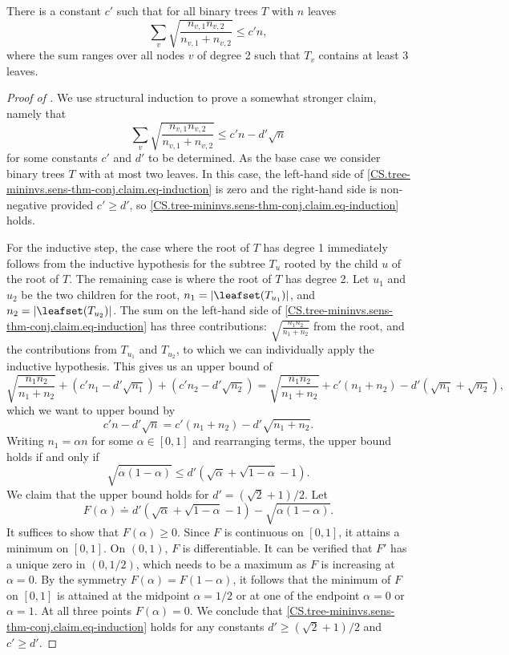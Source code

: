 \documentclass{toc}
\begin{document}
\begin{claim}
    \label{claim:sensitivity:sum}
    There is a constant $c'$ such that for all binary trees $T$ with $n$ leaves 
    \begin{equation}
      \sum_v \sqrt{\frac{n_{v,1}n_{v,2}}{n_{v,1}+n_{v,2}}} \le c'n,
    \end{equation}
    where the sum ranges over all nodes $v$ of degree 2 such that $T_v$ contains at least 3 leaves.
  \end{claim}
\begin{proof}[Proof of ]
We use structural induction to prove a somewhat stronger claim, namely that
\begin{equation}\label{CS.tree-mininvs.sens-thm-conj.claim.eq-induction}
  \sum_v \sqrt{\frac{n_{v,1}n_{v,2}}{n_{v,1}+n_{v,2}}} \le c' n - d' \sqrt{n}
\end{equation}
for some constants $c'$ and $d'$ to be determined.
As the base case we consider binary trees $T$ with at most two leaves. In this case, the left-hand side of \eqref{CS.tree-mininvs.sens-thm-conj.claim.eq-induction} is zero and the right-hand side is non-negative provided $c' \ge d'$, so \eqref{CS.tree-mininvs.sens-thm-conj.claim.eq-induction} holds. 

For the inductive step, the case where the root of $T$ has degree 1 immediately follows from the inductive hypothesis for the subtree $T_u$ rooted by the child $u$ of the root of $T$. The remaining case is where the root of $T$ has degree 2. Let $u_1$ and $u_2$ be the two children for the root, $n_1 = \lvert\leafset(T_{u_1})\rvert$, and 
$n_2 = \lvert\leafset(T_{u_2})\rvert$. The sum on the left-hand side of \eqref{CS.tree-mininvs.sens-thm-conj.claim.eq-induction} has three contributions: $\sqrt{\frac{n_1 n_2}{n_1+n_2}}$ from the root, and the contributions from $T_{u_1}$ and $T_{u_2}$, to which we can individually apply the inductive hypothesis. This gives us an upper bound of
\[ \sqrt{\frac{n_1 n_2}{n_1+n_2}} + (c' n_1 - d' \sqrt{n_1}) + (c' n_2 - d' \sqrt{n_2})
=  \sqrt{\frac{n_1 n_2}{n_1+n_2}} + c' (n_1 + n_2) - d' (\sqrt{n_1} + \sqrt{n_2}), \]
which we want to upper bound by
\[ c' n - d' \sqrt{n} = c' (n_1 + n_2) - d' \sqrt{n_1+n_2}. \]
Writing $n_1 = \alpha n$ for some $\alpha \in [0,1]$ and rearranging terms, the upper bound holds if and only if
\[ \sqrt{\alpha(1-\alpha)} \le d' (\sqrt{\alpha} + \sqrt{1-\alpha} -1). \]
We claim that the upper bound holds for $d'= (\sqrt{2}+1)/2$. Let 
\[F(\alpha) \doteq d'(\sqrt{\alpha}+\sqrt{1-\alpha}-1)-\sqrt{\alpha(1-\alpha)}.\]
It suffices to show that $F(\alpha)\ge 0$. Since $F$ is continuous on $[0,1]$, it attains a minimum on $[0,1]$. On $(0,1)$, $F$ is differentiable. It can be verified that $F'$ has a unique zero in $(0,1/2)$, which needs to be a maximum as $F$ is increasing at $\alpha=0$. By the symmetry $F(\alpha)=F(1-\alpha)$, it follows that the minimum of $F$ on $[0,1]$ is attained at the midpoint $\alpha=1/2$ or at one of the endpoint $\alpha=0$ or $\alpha=1$. At all three points $F(\alpha)=0$. 
We conclude that \eqref{CS.tree-mininvs.sens-thm-conj.claim.eq-induction} holds for any constants $d' \ge (\sqrt{2}+1)/2$ and $c' \ge d'$.
\end{proof}
\end{document}
